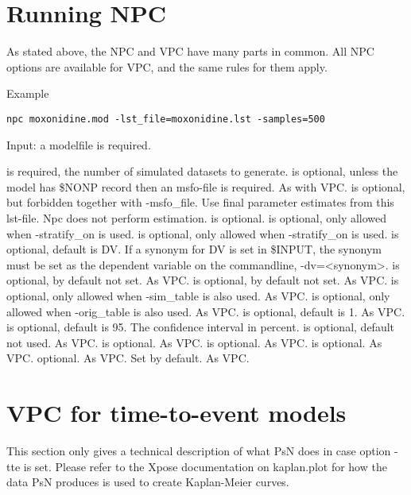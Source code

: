 \section{Running NPC}
As stated above, the NPC and VPC have many parts in common. All NPC options are available for VPC, and the same rules for them apply.

Example
\begin{verbatim}
npc moxonidine.mod -lst_file=moxonidine.lst -samples=500 
\end{verbatim}

Input: a modelfile is required.

\begin{optionlist}
is required, the number of simulated datasets to generate. 
\nextopt
{}
is optional, unless the model has \$NONP record then an msfo-file 	is required. As with VPC. 
\nextopt
{}
is optional, but forbidden together with -msfo\_file. Use final parameter estimates from this lst-file. Npc does not perform estimation. 
\nextopt
{}
is optional.  
\nextopt
{}
is optional, only allowed when -stratify\_on is used. 
\nextopt
{}
is optional, only allowed when -stratify\_on is used. 
\nextopt
{}
is optional, default is DV. If a synonym for DV is set in \$INPUT, the synonym must be set as the dependent variable on the commandline, -dv=<synonym>. 
\nextopt
{}
is optional, by default not set. As VPC. 
\nextopt
{}
is optional, by default not set. As VPC. 
\nextopt
{}
is optional, only allowed when -sim\_table is also used. As VPC. 
\nextopt
{}
is optional, only allowed when -orig\_table is also used. As VPC. 
\nextopt
{}
is optional, default is 1. As VPC. 
\nextopt
{}
is optional, default is 95. The confidence interval in percent. 
\nextopt
{}
is optional, default not used. As VPC. 
\nextopt
{}
is optional. As VPC.    
\nextopt
{}
is optional. As VPC. 
\nextopt
{}
is optional. As VPC.    
\nextopt
{}
optional. As VPC. 
\nextopt
{}
Set by default. As VPC. 
\nextopt
\end{optionlist}


\section {VPC for time-to-event models}
This section only gives a technical description of what PsN does in case option -tte is set. Please refer to the Xpose documentation on kaplan.plot for how the data PsN produces is used to create Kaplan-Meier curves.

